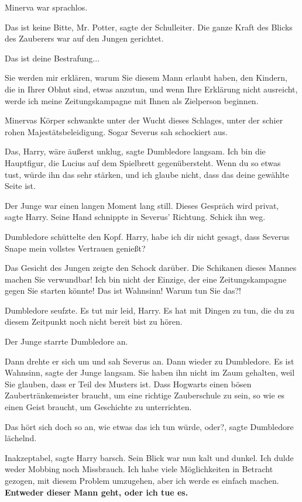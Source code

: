 Minerva war sprachlos.

\glqq{}Das ist keine Bitte, Mr. Potter\grqq{}, sagte der Schulleiter. Die ganze
Kraft des Blicks des Zauberers war auf den Jungen gerichtet.

\glqq{}Das ist deine Bestrafung...\grqq{}

\glqq{}Sie werden mir erklären, warum Sie diesem Mann erlaubt haben, den Kindern,
die in Ihrer Obhut sind, etwas anzutun, und wenn Ihre Erklärung nicht ausreicht,
werde ich meine Zeitungskampagne mit Ihnen als Zielperson beginnen.\grqq{}

Minervas Körper schwankte unter der Wucht dieses Schlages, unter der schier
rohen Majestätsbeleidigung. Sogar Severus sah schockiert aus.

\glqq{}Das, Harry, wäre äußerst unklug\grqq{}, sagte Dumbledore langsam. \glqq{}
Ich bin die Hauptfigur, die Lucius auf dem Spielbrett gegenübersteht. Wenn du so
etwas tust, würde ihn das sehr stärken, und ich glaube nicht, dass das deine
gewählte Seite ist.\grqq{}

Der Junge war einen langen Moment lang still. \glqq{}Dieses Gespräch wird
privat\grqq{}, sagte Harry. Seine Hand schnippte in Severus' Richtung. \glqq{}
Schick ihn weg.\grqq{}

Dumbledore schüttelte den Kopf. \glqq{}Harry, habe ich dir nicht gesagt, dass
Severus Snape mein vollstes Vertrauen genießt?\grqq{}

Das Gesicht des Jungen zeigte den Schock darüber. \glqq{}Die Schikanen dieses
Mannes machen Sie verwundbar! Ich bin nicht der Einzige, der eine
Zeitungskampagne gegen Sie starten könnte! Das ist Wahnsinn! Warum tun Sie
das?!\grqq{}

Dumbledore seufzte. \glqq{}Es tut mir leid, Harry. Es hat mit Dingen zu tun, die
du zu diesem Zeitpunkt noch nicht bereit bist zu hören.\grqq{}

Der Junge starrte Dumbledore an.

Dann drehte er sich um und sah Severus an. Dann wieder zu Dumbledore. \glqq{}Es
ist Wahnsinn\grqq{}, sagte der Junge langsam. \glqq{}Sie haben ihn nicht im Zaum
gehalten, weil Sie glauben, dass er Teil des Musters ist. Dass Hogwarts einen
bösen Zaubertränkemeister braucht, um eine richtige Zauberschule zu sein, so wie
es einen Geist braucht, um Geschichte zu unterrichten.\grqq{}

\glqq{}Das hört sich doch so an, wie etwas das ich tun würde, oder?\grqq{}, sagte
Dumbledore lächelnd.

\glqq{}Inakzeptabel\grqq{}, sagte Harry barsch. Sein Blick war nun kalt und
dunkel. \glqq{}Ich dulde weder Mobbing noch Missbrauch. Ich habe viele
Möglichkeiten in Betracht gezogen, mit diesem Problem umzugehen, aber ich werde
es einfach machen. \textbf{Entweder dieser Mann geht, oder ich tue es.}\grqq{}


